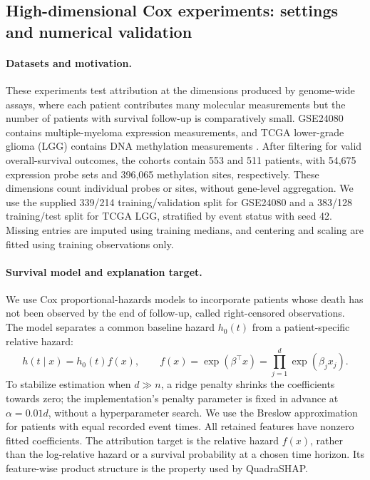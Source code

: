 \subsection{High-dimensional Cox experiments: settings and numerical validation}
\label{app:cox-high-dimensional}

\paragraph{Datasets and motivation.}
These experiments test attribution at the dimensions produced by
genome-wide assays, where each patient contributes many molecular
measurements but the number of patients with survival follow-up is
comparatively small. GSE24080 contains multiple-myeloma expression
measurements, and TCGA lower-grade glioma (LGG) contains DNA methylation
measurements \cite{geo_gse24080,tcga_lgg_methylation}.
After filtering for valid overall-survival outcomes, the cohorts contain
553 and 511 patients, with 54,675 expression probe sets and 396,065
methylation sites, respectively. These dimensions count individual probes
or sites, without gene-level aggregation. We use the supplied 339/214
training/validation split for GSE24080 and a 383/128 training/test split
for TCGA LGG, stratified by event status with seed 42. Missing entries
are imputed using training medians, and centering and scaling are fitted
using training observations only.

\paragraph{Survival model and explanation target.}
We use Cox proportional-hazards models to incorporate patients whose
death has not been observed by the end of follow-up, called right-censored
observations. The model separates a common baseline hazard $h_0(t)$
from a patient-specific relative hazard:
\[
 h(t\mid x)=h_0(t)f(x),\qquad
 f(x)=\exp(\beta^\top x)=\prod_{j=1}^{d}\exp(\beta_jx_j).
\]
To stabilize estimation when $d\gg n$, a ridge penalty shrinks the
coefficients towards zero; the implementation's penalty parameter is
fixed in advance at $\alpha=0.01d$, without a hyperparameter search.
We use the Breslow approximation for patients with equal recorded event
times. All retained features have nonzero fitted coefficients.
The attribution target is the relative hazard $f(x)$, rather than the
log-relative hazard or a survival probability at a chosen time horizon.
Its feature-wise product structure is the property used by QuadraSHAP.

